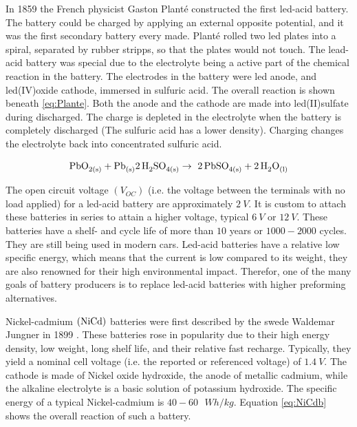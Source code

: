 In 1859 the French physicist Gaston Planté constructed the first led-acid battery. The battery could be charged by applying an external opposite potential, and it was the first secondary battery every made. Planté rolled two led plates into a spiral, separated by rubber stripps, so that the plates would not touch. The lead-acid battery was special due to the electrolyte being a active part of the chemical reaction in the battery. The electrodes in the battery were led anode, and led(IV)oxide cathode, immersed in sulfuric acid. The overall reaction is shown beneath \ref{eq:Plante}. Both the anode and the cathode are made into led(II)sulfate during discharged. The charge is depleted in the electrolyte when the battery is completely discharged (The sulfuric acid has a lower density). Charging changes the electrolyte back into concentrated sulfuric acid. 

\begin{align}\label{eq:Plante}
\ce{PbO_{2(s)}} + \ce{Pb_{(s)}} \ce{2H_2SO_{4(s)}} \rightarrow \ce{2PbSO_{4(s)}} +\ce{2H_2O_{(l)}}
\end{align}

The open circuit voltage $(V_{OC})$ (i.e. the voltage between the terminals with no load applied) for a led-acid battery are approximately $\SI{2}{V}$. It is custom to attach these batteries in series to attain a higher voltage, typical $\SI{6}{V}$ or $\SI{12}{V}$. These batteries have a shelf- and cycle life of more than $10$ years or $1000-2000$ cycles. They are still being used in modern cars. Led-acid batteries have a relative low specific energy, which means that the current is low compared to its weight, they are also renowned for their high environmental impact. Therefor, one of the many goals of battery producers is to replace led-acid batteries with higher preforming alternatives.  

Nickel-cadmium $(\ce{NiCd})$ batteries were first described by the swede Waldemar Jungner in 1899 \cite{daniel2012handbook}. These batteries rose in popularity due to their high energy density, low weight, long shelf life, and their relative fast recharge. Typically, they yield a nominal cell voltage (i.e. the reported or referenced voltage) of $\SI{1.4}{V}$. The cathode is made of Nickel oxide hydroxide, the anode of metallic cadmium, while the alkaline electrolyte is a basic solution of potassium hydroxide. The specific energy of a typical Nickel-cadmium is $40-60\text{ }\si{W h/kg}$. Equation \ref{eq:NiCdb} shows the overall reaction of such a battery.

